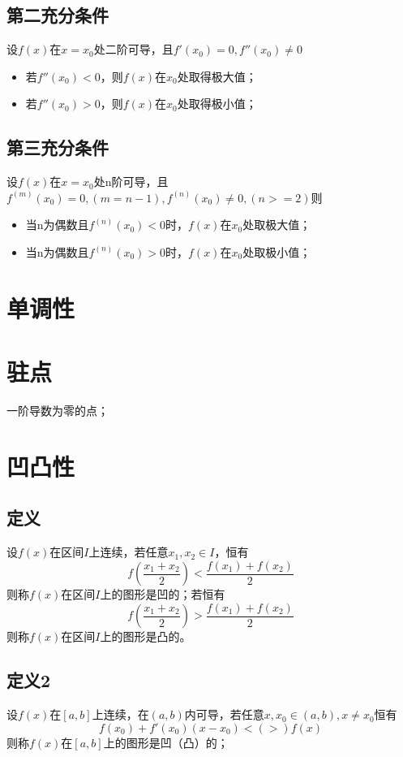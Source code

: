 \subsection{第二充分条件}
设\(f(x)\)在\(x = x_0\)处二阶可导，且\(f'(x_0) = 0, f''(x_0) \neq 0\)\begin{itemize}
    \item 若\(f''(x_0) < 0\)，则\(f(x)\)在\(x_0\)处取得极大值；
    \item 若\(f''(x_0) > 0\)，则\(f(x)\)在\(x_0\)处取得极小值；
\end{itemize}


\subsection{第三充分条件}
设\(f(x)\)在\(x = x_0\)处n阶可导，且\(f^{(m)}(x_0) = 0, (m = n - 1), f^{(n)}(x_0) \neq 0, (n >= 2)\)则\begin{itemize}
    \item 当n为偶数且\(f^{(n)}(x_0) < 0\)时，\(f(x)\)在\(x_0\)处取极大值；
    \item 当n为偶数且\(f^{(n)}(x_0) > 0\)时，\(f(x)\)在\(x_0\)处取极小值；
\end{itemize}


\section{单调性}


\section{驻点}
一阶导数为零的点；


\section{凹凸性}

\subsection{定义}
设\(f(x)\)在区间\(I\)上连续，若任意\(x_1, x_2 \in I\)，恒有\[f(\dfrac{x_1 + x_2}{2}) < \dfrac{f(x_1) + f(x_2)}{2}\]则称\(f(x)\)在区间\(I\)上的图形是凹的；若恒有
\[f(\dfrac{x_1 + x_2}{2}) > \dfrac{f(x_1) + f(x_2)}{2}\]
则称\(f(x)\)在区间\(I\)上的图形是凸的。


\subsection{定义2}
设\(f(x)\)在\([a, b]\)上连续，在\((a, b)\)内可导，若任意\(x, x_0 \in (a, b), x \neq x_0\)恒有\[f(x_0) + f'(x_0)(x - x_0) <(>) f(x)\]则称\(f(x)\)在\([a, b]\)上的图形是凹（凸）的；


